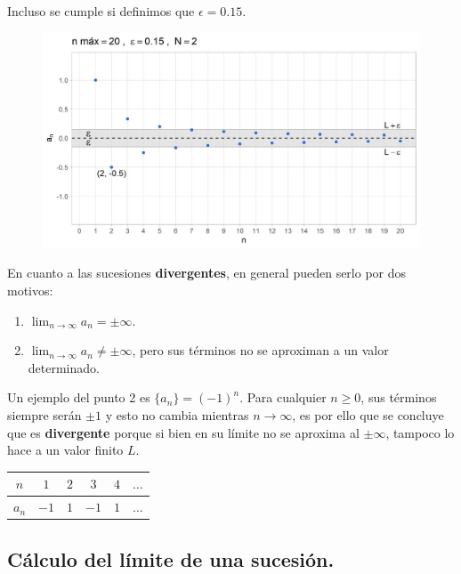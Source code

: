 \documentclass[12pt]{article}
\begin{document}
Incluso se cumple si definimos que $\epsilon = 0.15$.

\begin{figure}[hbt!]
\centering
\includegraphics[scale=0.7]{limit-seq-02.jpg}
\end{figure}

En cuanto a las sucesiones \textbf{divergentes}, en general pueden serlo por dos motivos:

\begin{enumerate}
\item $\lim_{n \to \infty} a_{n} = \pm \infty$.
\item $\lim_{n \to \infty} a_{n} \neq \pm \infty$, pero sus términos no se aproximan a un valor determinado.
\end{enumerate}

Un ejemplo del punto 2 es $\{a_{n}\} = (-1)^{n}$. Para cualquier $n \geq 0$, sus términos siempre serán $\pm 1$ y esto no cambia mientras $n \to \infty$, es por ello que se concluye que es \textbf{divergente} porque si bien en su límite no se aproxima al $\pm \infty$, tampoco lo hace a un valor finito $L$.

\begin{table}[hbt!]
\centering

\begin{tabular}{c | c c c c c}
$n$ & $1$ & $2$ & $3$ & $4$ & $\ldots$ \\
\hline
$a_{n}$ & $-1$ & $1$ & $-1$ & $1$ & $\ldots$
\end{tabular}

\end{table}

\subsection{Cálculo del límite de una sucesión.}
\end{document}
